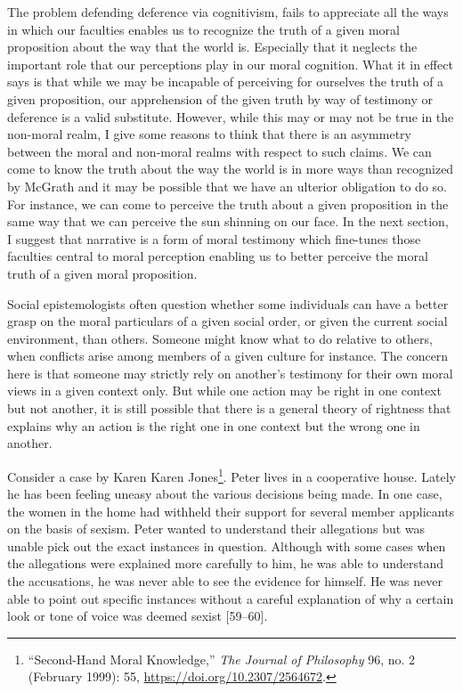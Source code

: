 \documentclass[phdthesis,12pt,final]{wuthesis}
\theoremstyle{definition}
\theoremstyle{definition}
\theoremstyle{definition}
\theoremstyle{definition}
\theoremstyle{remark}
\begin{document}
The problem defending deference via cognitivism, fails to appreciate all the ways in which our faculties enables us to recognize the truth of a given moral proposition about the way that the world is. Especially that it neglects the important role that our perceptions play in our moral cognition. What it in effect says is that while we may be incapable of perceiving for ourselves the truth of a given proposition, our apprehension of the given truth by way of testimony or deference is a valid substitute. However, while this may or may not be true in the non-moral realm, I give some reasons to think that there is an asymmetry between the moral and non-moral realms with respect to such claims. We can come to know the truth about the way the world is in more ways than recognized by McGrath and it may be possible that we have an ulterior obligation to do so. For instance, we can come to perceive the truth about a given proposition in the same way that we can perceive the sun shinning on our face. In the next section, I suggest that narrative is a form of moral testimony which fine-tunes those faculties central to moral perception enabling us to better perceive the moral truth of a given moral proposition.

Social epistemologists often question whether some individuals can have a better grasp on the moral particulars of a given social order, or given the current social environment, than others. Someone might know what to do relative to others, when conflicts arise among members of a given culture for instance. The concern here is that someone may strictly rely on another's testimony for their own moral views in a given context only. But while one action may be right in one context but not another, it is still possible that there is a general theory of rightness that explains why an action is the right one in one context but the wrong one in another.

Consider a case by Karen Karen Jones\footnote{{``Second-{Hand Moral Knowledge},''} \emph{The Journal of Philosophy} 96, no. 2 (February 1999): 55, \url{https://doi.org/10.2307/2564672}.}. Peter lives in a cooperative house. Lately he has been feeling uneasy about the various decisions being made. In one case, the women in the home had withheld their support for several member applicants on the basis of sexism. Peter wanted to understand their allegations but was unable pick out the exact instances in question. Although with some cases when the allegations were explained more carefully to him, he was able to understand the accusations, he was never able to see the evidence for himself. He was never able to point out specific instances without a careful explanation of why a certain look or tone of voice was deemed sexist {[}59--60{]}.
\end{document}

